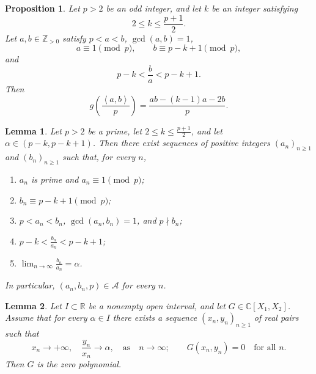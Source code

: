 \documentclass[10pt,a4paper]{amsart}
\newtheorem{proposition}{Proposition}
\newtheorem{lemma}{Lemma}
\newcommand{\CC}{\mathbb{C}}
\newcommand{\ZZ}{\mathbb{Z}}
\newcommand{\cA}{\mathcal{A}}
\newcommand{\gen}[1]{\left\langle #1\right\rangle}
\begin{document}
\begin{proposition}\label{prop:explicit-branch}
Let $p>2$ be an odd integer, and let $k$ be an integer satisfying
\begin{equation}\label{eq:k-range}
  2\le k\le\frac{p+1}{2}.
\end{equation}
Let $a,b\in\ZZ_{>0}$ satisfy $p<a<b$, $\gcd(a,b)=1$,
\begin{equation}\label{eq:branch-congruences}
a\equiv1\pmod p, \qquad b\equiv p-k+1\pmod p,
\end{equation}
and
\begin{equation}\label{eq:branch-slope}
  p-k<\frac{b}{a}<p-k+1.
\end{equation}
Then
\begin{equation}\label{eq:explicit-branch}
  g\!\left(\frac{\gen{a,b}}{p}\right)
  =\frac{ab-(k-1)a-2b}{p}.
\end{equation}
\end{proposition}

\begin{lemma}\label{lem:approximation}
Let $p>2$ be a prime, let $2\le k\le\frac{p+1}{2}$, and let $\alpha\in(p-k,p-k+1)$.
Then there exist sequences of positive integers $(a_n)_{n\ge1}$ and
$(b_n)_{n\ge1}$ such that, for every $n$,
\begin{enumerate}
  \item $a_n$ is prime and $a_n\equiv1\pmod p$;
  \item $b_n\equiv p-k+1\pmod p$;
  \item $p<a_n<b_n$, $\gcd(a_n,b_n)=1$, and $p\nmid b_n$;
  \item $p-k<\frac{b_n}{a_n}<p-k+1$;
  \item $\lim_{n\to\infty}\frac{b_n}{a_n}=\alpha$.
\end{enumerate}
In particular, $(a_n,b_n,p)\in\cA$ for every $n$.
\end{lemma}

\begin{lemma}\label{lem:asymptotic-vanishing}
Let $I\subset\mathbb R$ be a nonempty open interval, and let
$G\in\CC[X_1,X_2]$.  Assume that for every $\alpha\in I$ there exists a
sequence $(x_n,y_n)_{n\ge1}$ of real pairs such that
\begin{equation}\label{eq:asymptotic-hypotheses}
  x_n\longrightarrow+\infty,
  \quad
  \frac{y_n}{x_n}\longrightarrow\alpha,\quad \text{as}\quad n\longrightarrow\infty;
  \qquad
  G(x_n,y_n)=0
  \quad\text{for all }n.
\end{equation}
Then $G$ is the zero polynomial.
\end{lemma}
\end{document}
